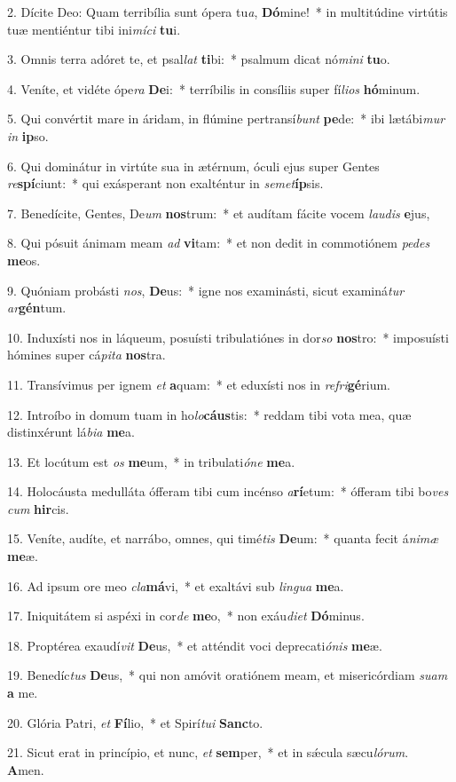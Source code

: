 2. Dícite Deo: Quam terribília sunt ópera tu\textit{a}, \textbf{Dó}mine!~*  in multitúdine virtútis tuæ mentiéntur tibi ini\textit{mí}\textit{ci} \textbf{tu}i.\

3. Omnis terra adóret te, et psal\textit{lat} \textbf{ti}bi:~*  psalmum dicat nó\textit{mi}\textit{ni} \textbf{tu}o.\

4. Veníte, et vidéte ópe\textit{ra} \textbf{De}i:~*  terríbilis in consíliis super fí\textit{li}\textit{os} \textbf{hó}minum.\

5. Qui convértit mare in áridam, in flúmine pertransí\textit{bunt} \textbf{pe}de:~*  ibi lætábi\textit{mur} \textit{in} \textbf{ip}so.\

6. Qui dominátur in virtúte sua in ætérnum, óculi ejus super Gentes \textit{re}\textbf{spí}ciunt:~*  qui exásperant non exalténtur in \textit{se}\textit{met}\textbf{íp}sis.\

7. Benedícite, Gentes, De\textit{um} \textbf{nos}trum:~*  et audítam fácite vocem \textit{lau}\textit{dis} \textbf{e}jus,\

8. Qui pósuit ánimam meam \textit{ad} \textbf{vi}tam:~*  et non dedit in commotiónem \textit{pe}\textit{des} \textbf{me}os.\

9. Quóniam probásti \textit{nos}, \textbf{De}us:~*  igne nos examinásti, sicut examiná\textit{tur} \textit{ar}\textbf{gén}tum.\

10. Induxísti nos in láqueum, posuísti tribulatiónes in dor\textit{so} \textbf{nos}tro:~*  imposuísti hómines super cá\textit{pi}\textit{ta} \textbf{nos}tra.\

11. Transívimus per ignem \textit{et} \textbf{a}quam:~*  et eduxísti nos in \textit{re}\textit{fri}\textbf{gé}rium.\

12. Introíbo in domum tuam in ho\textit{lo}\textbf{cáus}tis:~*  reddam tibi vota mea, quæ distinxérunt lá\textit{bi}\textit{a} \textbf{me}a.\

13. Et locútum est \textit{os} \textbf{me}um,~*  in tribulati\textit{ó}\textit{ne} \textbf{me}a.\

14. Holocáusta medulláta ófferam tibi cum incénso \textit{a}\textbf{rí}etum:~*  ófferam tibi bo\textit{ves} \textit{cum} \textbf{hir}cis.\

15. Veníte, audíte, et narrábo, omnes, qui timé\textit{tis} \textbf{De}um:~*  quanta fecit á\textit{ni}\textit{mæ} \textbf{me}æ.\

16. Ad ipsum ore meo \textit{cla}\textbf{má}vi,~*  et exaltávi sub \textit{lin}\textit{gua} \textbf{me}a.\

17. Iniquitátem si aspéxi in cor\textit{de} \textbf{me}o,~*  non exáu\textit{di}\textit{et} \textbf{Dó}minus.\

18. Proptérea exaudí\textit{vit} \textbf{De}us,~*  et atténdit voci deprecati\textit{ó}\textit{nis} \textbf{me}æ.\

19. Benedíc\textit{tus} \textbf{De}us,~*  qui non amóvit oratiónem meam, et misericórdiam \textit{su}\textit{am} \textbf{a} me.\

20. Glória Patri, \textit{et} \textbf{Fí}lio,~*  et Spirí\textit{tu}\textit{i} \textbf{Sanc}to.\

21. Sicut erat in princípio, et nunc, \textit{et} \textbf{sem}per,~*  et in sǽcula sæcu\textit{ló}\textit{rum}. \textbf{A}men.\

